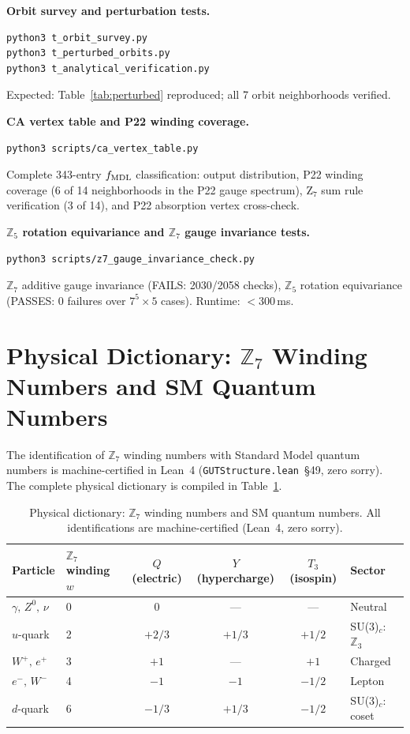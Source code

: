 \documentclass[11pt]{article}
\theoremstyle{remark}
\begin{document}
\begin{appendices}
\textbf{Orbit survey and perturbation tests.}
\begin{verbatim}
python3 t_orbit_survey.py
python3 t_perturbed_orbits.py
python3 t_analytical_verification.py
\end{verbatim}
Expected: Table~\ref{tab:perturbed} reproduced; all 7 orbit neighborhoods verified.

\textbf{CA vertex table and P22 winding coverage.}
\begin{verbatim}
python3 scripts/ca_vertex_table.py
\end{verbatim}
Complete 343-entry $f_{\rm MDL}$ classification: output distribution, P22 winding coverage
(6 of 14 neighborhoods in the P22 gauge spectrum), Z$_7$ sum rule verification
(3 of 14), and P22 absorption vertex cross-check.

\textbf{$\mathbb{Z}_5$ rotation equivariance and $\mathbb{Z}_7$ gauge invariance tests.}
\begin{verbatim}
python3 scripts/z7_gauge_invariance_check.py
\end{verbatim}
$\mathbb{Z}_7$ additive gauge invariance (FAILS: 2030/2058 checks),
$\mathbb{Z}_5$ rotation equivariance (PASSES: 0 failures over $7^5{\times}5$ cases).
Runtime: $<$300\,ms.

\section{Physical Dictionary: $\mathbb{Z}_7$ Winding Numbers and SM Quantum Numbers}
\label{sec:phys_dict}

The identification of $\mathbb{Z}_7$ winding numbers with Standard Model quantum
numbers is machine-certified in Lean~4 (\texttt{GUTStructure.lean}~\S49, zero sorry).
The complete physical dictionary is compiled in Table~\ref{tab:phys_dict}.

\begin{table}[ht]
\centering
\caption{Physical dictionary: $\mathbb{Z}_7$ winding numbers and SM quantum numbers.
All identifications are machine-certified (Lean~4, zero sorry).}
\label{tab:phys_dict}
\begin{tabular}{llcccl}
\toprule
Particle & $\mathbb{Z}_7$ winding $w$ & $Q$ (electric) & $Y$ (hypercharge) & $T_3$ (isospin) & Sector \\
\midrule
$\gamma,\, Z^0,\, \nu$ & 0 & 0 & --- & --- & Neutral \\
$u$-quark & 2 & $+2/3$ & $+1/3$ & $+1/2$ & SU(3)$_c$: $\mathbb{Z}_3$ \\
$W^+,\, e^+$ & 3 & $+1$ & --- & $+1$ & Charged \\
$e^-,\, W^-$ & 4 & $-1$ & $-1$ & $-1/2$ & Lepton \\
$d$-quark & 6 & $-1/3$ & $+1/3$ & $-1/2$ & SU(3)$_c$: coset \\
\bottomrule
\end{tabular}
\end{table}


\end{appendices}
\end{document}
